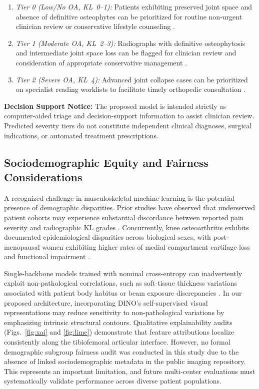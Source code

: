 \documentclass[10pt,journal]{IEEEtran}
\begin{document}
\begin{enumerate}[leftmargin=*]
\item \textit{Tier 0 (Low/No OA, KL~0--1):} Patients exhibiting preserved joint space and absence of definitive osteophytes can be prioritized for routine non-urgent clinician review or conservative lifestyle counseling \cite{zhang2010eular}.
\item \textit{Tier 1 (Moderate OA, KL~2--3):} Radiographs with definitive osteophytosis and intermediate joint space loss can be flagged for clinician review and consideration of appropriate conservative management \cite{zhang2010eular}.
\item \textit{Tier 2 (Severe OA, KL~4):} Advanced joint collapse cases can be prioritized on specialist reading worklists to facilitate timely orthopedic consultation \cite{carr2012knee}.
\end{enumerate}

\noindent\textbf{Decision Support Notice:} The proposed model is intended strictly as computer-aided triage and decision-support information to assist clinician review. Predicted severity tiers do not constitute independent clinical diagnoses, surgical indications, or automated treatment prescriptions.

\subsection{Sociodemographic Equity and Fairness Considerations}
\label{subsec:bias_fairness}

A recognized challenge in musculoskeletal machine learning is the potential presence of demographic disparities. Prior studies have observed that underserved patient cohorts may experience substantial discordance between reported pain severity and radiographic KL grades \cite{pierson2021algorithmic}. Concurrently, knee osteoarthritis exhibits documented epidemiological disparities across biological sexes, with post-menopausal women exhibiting higher rates of medial compartment cartilage loss and functional impairment \cite{hunter2019oa, loeser2012oa}.

Single-backbone models trained with nominal cross-entropy can inadvertently exploit non-pathological correlations, such as soft-tissue thickness variations associated with patient body habitus or beam exposure discrepancies \cite{tajbakhsh2016convolutional}. In our proposed architecture, incorporating DINO's self-supervised visual representations may reduce sensitivity to non-pathological variations by emphasizing intrinsic structural contours. Qualitative explainability audits (Figs.~\ref{fig:xai} and \ref{fig:lime}) demonstrate that feature attributions localize consistently along the tibiofemoral articular interface. However, no formal demographic subgroup fairness audit was conducted in this study due to the absence of linked sociodemographic metadata in the public imaging repository. This represents an important limitation, and future multi-center evaluations must systematically validate performance across diverse patient populations.
\end{document}
